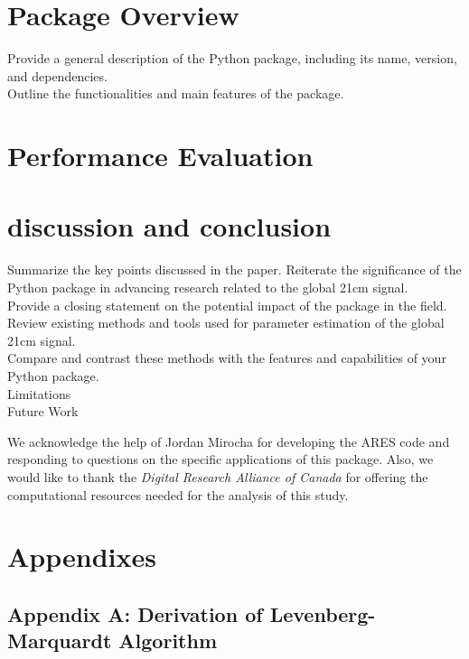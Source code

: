 \documentclass[%
 reprint,
 amsmath,amssymb,
 aps,
]{revtex4-2}
\begin{document}
\section{Package Overview}
Provide a general description of the Python package, including its name, version, and dependencies.\\
Outline the functionalities and main features of the package.\\
\section{Performance Evaluation}
\section{discussion and conclusion}
Summarize the key points discussed in the paper.
Reiterate the significance of the Python package in advancing research related to the global 21cm signal.\\
Provide a closing statement on the potential impact of the package in the field.\\
Review existing methods and tools used for parameter estimation of the global 21cm signal.\\
Compare and contrast these methods with the features and capabilities of your Python package.\\
Limitations\\
Future Work\\
\begin{acknowledgements}
     We acknowledge the help of Jordan Mirocha for developing the ARES code and responding to questions on the specific applications of this package. Also, we would like to thank the \emph{Digital Research Alliance of Canada} for offering the computational resources needed for the analysis of this study.
\end{acknowledgements}

\appendix

\section{Appendixes}
\subsection{Appendix A: Derivation of Levenberg-Marquardt Algorithm}



\end{document}
